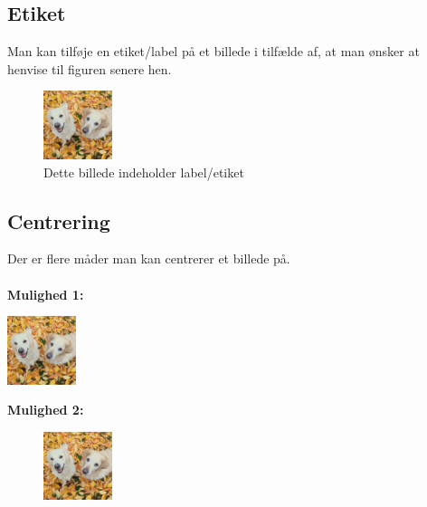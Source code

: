 \documentclass[11pt]{article}
\begin{document}
\subsection{Etiket}
Man kan tilføje en etiket/label på et billede i tilfælde af, at man ønsker at henvise til figuren senere hen.

\begin{figure}[H] 
\centering
\includegraphics[width=2cm]{carlaogbella}
\caption{Dette billede indeholder label/etiket}
\label{fig:carlaogbella} %
\end{figure}
\subsection{Centrering}
Der er flere måder man kan centrerer et billede på.\\\\
\textbf{Mulighed 1:}
\begin{center}
\includegraphics[width=2cm]{carlaogbella}
\end{center}
\textbf{Mulighed 2:}
\begin{figure}[H]
\centering
\includegraphics[width=2cm]{carlaogbella}
\end{figure}
\end{document}
